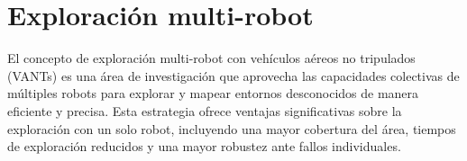 

\section{Exploración multi-robot}

El concepto de exploración multi-robot con vehículos aéreos no tripulados (VANTs) es una área de investigación que aprovecha las capacidades colectivas de múltiples robots para explorar y mapear entornos desconocidos de manera eficiente y precisa. Esta estrategia ofrece ventajas significativas sobre la exploración con un solo robot, incluyendo una mayor cobertura del área, tiempos de exploración reducidos y una mayor robustez ante fallos individuales.


